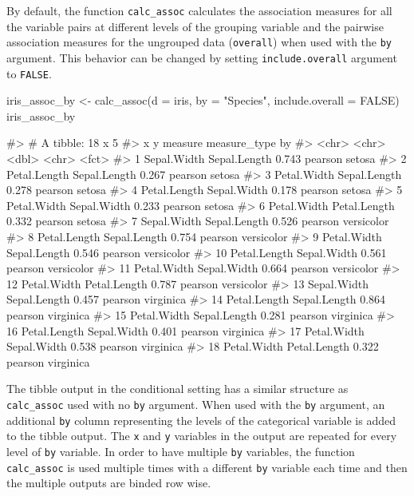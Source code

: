 By default, the function \texttt{calc\_assoc} calculates the association
measures for all the variable pairs at different levels of the grouping
variable and the pairwise association measures for the ungrouped data
(\texttt{overall}) when used with the \texttt{by} argument. This
behavior can be changed by setting \texttt{include.overall} argument to
\texttt{FALSE}.

\begin{Schunk}
\begin{Sinput}
iris_assoc_by <- calc_assoc(d = iris,
                            by = "Species",
                            include.overall = FALSE)
iris_assoc_by
\end{Sinput}
\begin{Soutput}
#> # A tibble: 18 x 5
#>    x            y            measure measure_type by        
#>    <chr>        <chr>          <dbl> <chr>        <fct>     
#>  1 Sepal.Width  Sepal.Length   0.743 pearson      setosa    
#>  2 Petal.Length Sepal.Length   0.267 pearson      setosa    
#>  3 Petal.Width  Sepal.Length   0.278 pearson      setosa    
#>  4 Petal.Length Sepal.Width    0.178 pearson      setosa    
#>  5 Petal.Width  Sepal.Width    0.233 pearson      setosa    
#>  6 Petal.Width  Petal.Length   0.332 pearson      setosa    
#>  7 Sepal.Width  Sepal.Length   0.526 pearson      versicolor
#>  8 Petal.Length Sepal.Length   0.754 pearson      versicolor
#>  9 Petal.Width  Sepal.Length   0.546 pearson      versicolor
#> 10 Petal.Length Sepal.Width    0.561 pearson      versicolor
#> 11 Petal.Width  Sepal.Width    0.664 pearson      versicolor
#> 12 Petal.Width  Petal.Length   0.787 pearson      versicolor
#> 13 Sepal.Width  Sepal.Length   0.457 pearson      virginica 
#> 14 Petal.Length Sepal.Length   0.864 pearson      virginica 
#> 15 Petal.Width  Sepal.Length   0.281 pearson      virginica 
#> 16 Petal.Length Sepal.Width    0.401 pearson      virginica 
#> 17 Petal.Width  Sepal.Width    0.538 pearson      virginica 
#> 18 Petal.Width  Petal.Length   0.322 pearson      virginica
\end{Soutput}
\end{Schunk}

The tibble output in the conditional setting has a similar structure as
\texttt{calc\_assoc} used with no \texttt{by} argument. When used with
the \texttt{by} argument, an additional \texttt{by} column representing
the levels of the categorical variable is added to the tibble output.
The \texttt{x} and \texttt{y} variables in the output are repeated for
every level of \texttt{by} variable. In order to have multiple
\texttt{by} variables, the function \texttt{calc\_assoc} is used
multiple times with a different \texttt{by} variable each time and then
the multiple outputs are binded row wise.

